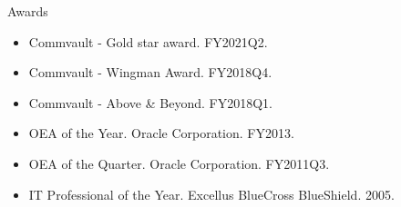 \documentclass{resume} %
\begin{document}
\begin{rSection}{Awards}
  \begin{itemize}
   \itemsep -3pt {} 
   \item Commvault - Gold star award. FY2021Q2.
   \item Commvault - Wingman Award. FY2018Q4.
   \item Commvault - Above \& Beyond. FY2018Q1.
   \item OEA of the Year. Oracle Corporation. FY2013.
   \item OEA of the Quarter. Oracle Corporation. FY2011Q3.
   \item IT Professional of the Year. Excellus BlueCross BlueShield. 2005.
  \end{itemize}  
\end{rSection}
\end{document}
